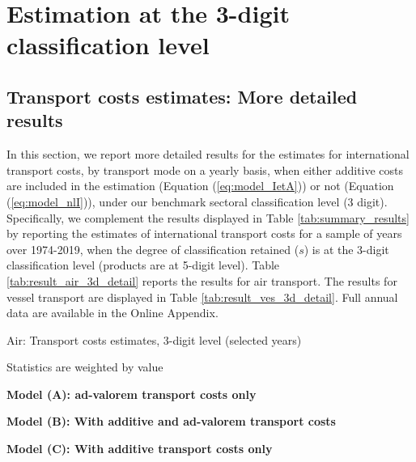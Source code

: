\documentclass[a4paper,11pt]{article}
\begin{document}
\clearpage
\setcounter{table}{0}
\setcounter{figure}{0}
\renewcommand{\thefigure}{B.\arabic{figure}}
\renewcommand{\thetable}{B.\arabic{table}}

\section{Estimation at the 3-digit classification level \label{app:more_results}}

\subsection{Transport costs estimates: More detailed results}

In this section, we report more detailed results for the estimates for international transport costs, by transport mode on a yearly basis, when either additive costs are included in the estimation (Equation (\ref{eq:model_IetA})) or not (Equation (\ref{eq:model_nlI})), under our benchmark sectoral classification level (3 digit).
Specifically, we complement the results displayed in Table \ref{tab:summary_results} by reporting the estimates of international transport costs for a sample of years over 1974-2019, when the degree of classification retained ($s$) is at the 3-digit classification level (products are at 5-digit level).
Table \ref{tab:result_air_3d_detail} reports the results for air transport.
The results for vessel transport are displayed in Table \ref{tab:result_ves_3d_detail}.
Full annual data are available in the Online Appendix.


\begin{table}[htbp]
	\centering
	\footnotesize{
	\caption{Air: Transport costs estimates, 3-digit level (selected years)}\vspace{5mm}
	\label{tab:result_air_3d_detail}%
	
   \begin{tablenotes}
	\tiny
	\item Statistics are weighted by value
	\item \textbf{Model (A): ad-valorem transport costs only}
	\item \textbf{Model (B): With additive and ad-valorem transport costs}
				\item \textbf{Model (C): With additive transport costs only}
\end{tablenotes}

}	
\end{table}%
\end{document}
